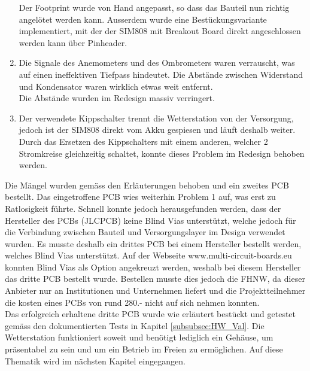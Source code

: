 \begin{enumerate}
Der Footprint wurde von Hand angepasst, so dass das Bauteil nun richtig angelötet werden kann. Ausserdem wurde eine Bestückungsvariante implementiert, mit der der SIM808 mit Breakout Board direkt angeschlossen werden kann über Pinheader.
\item Die Signale des Anemometers und des Ombrometers waren verrauscht, was auf einen ineffektiven Tiefpass hindeutet. Die Abstände zwischen Widerstand und Kondensator waren wirklich etwas weit entfernt.\\
Die Abstände wurden im Redesign massiv verringert.
\item Der verwendete Kippschalter trennt die Wetterstation von der Versorgung, jedoch ist der SIM808 direkt vom Akku gespiesen und läuft deshalb weiter.\\
Durch das Ersetzen des Kippschalters mit einem anderen, welcher 2 Stromkreise gleichzeitig schaltet, konnte dieses Problem im Redesign behoben werden.
\end{enumerate}
Die Mängel wurden gemäss den Erläuterungen behoben und ein zweites PCB bestellt. Das eingetroffene PCB wies weiterhin Problem 1 auf, was erst zu Ratlosigkeit führte. Schnell konnte jedoch herausgefunden werden, dass der Hersteller des PCBs (JLCPCB) keine Blind Vias unterstützt, welche jedoch für die Verbindung zwischen Bauteil und Versorgungslayer im Design verwendet wurden. Es musste deshalb ein drittes PCB bei einem Hersteller bestellt werden, welches Blind Vias unterstützt. Auf der Webseite www.multi-circuit-boards.eu konnten Blind Vias als Option angekreuzt werden, weshalb bei diesem Hersteller das dritte PCB bestellt wurde. Bestellen musste dies jedoch die FHNW, da dieser Anbieter nur an Institutionen und Unternehmen liefert und die Projektteilnehmer die kosten eines PCBs von rund 280.- nicht auf sich nehmen konnten. \\[0.5cm]
Das erfolgreich erhaltene dritte PCB wurde wie erläutert bestückt und getestet gemäss den dokumentierten Tests in Kapitel \ref{subsubsec:HW_Val}. Die Wetterstation funktioniert soweit und benötigt lediglich ein Gehäuse, um präsentabel zu sein und um ein Betrieb im Freien zu ermöglichen. Auf diese Thematik wird im nächsten Kapitel eingegangen.
